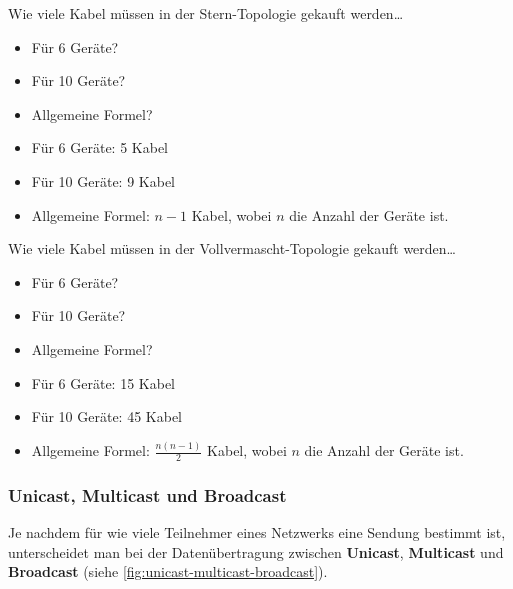 \begin{myexercise}
	Wie viele Kabel müssen in der Stern-Topologie gekauft werden\dots
	\begin{itemize}
		\item Für 6 Geräte?
		\item Für 10 Geräte?
		\item Allgemeine Formel?
	\end{itemize}
\begin{myanswer}
	\begin{itemize}
		\item Für 6 Geräte: 5 Kabel
		\item Für 10 Geräte: 9 Kabel
		\item Allgemeine Formel: $n-1$ Kabel, wobei $n$ die Anzahl der Geräte ist.
	\end{itemize}
\end{myanswer}
\end{myexercise}

\begin{myexercise}
	Wie viele Kabel müssen in der Vollvermascht-Topologie gekauft werden\dots
	\begin{itemize}
		\item Für 6 Geräte?
		\item Für 10 Geräte?
		\item Allgemeine Formel?
	\end{itemize}
\begin{myanswer}
	\begin{itemize}
		\item Für 6 Geräte: 15 Kabel
		\item Für 10 Geräte: 45 Kabel
		\item Allgemeine Formel: $\frac{n(n-1)}{2}$ Kabel, wobei $n$ die Anzahl der Geräte ist.
	\end{itemize}
\end{myanswer}
\end{myexercise}

\subsubsection{Unicast, Multicast und Broadcast}
Je nachdem für wie viele Teilnehmer eines Netzwerks eine Sendung bestimmt ist, unterscheidet man bei der Datenübertragung zwischen \textbf{Unicast}, \textbf{Multicast} und \textbf{Broadcast} (siehe \cref{fig:unicast-multicast-broadcast}).

